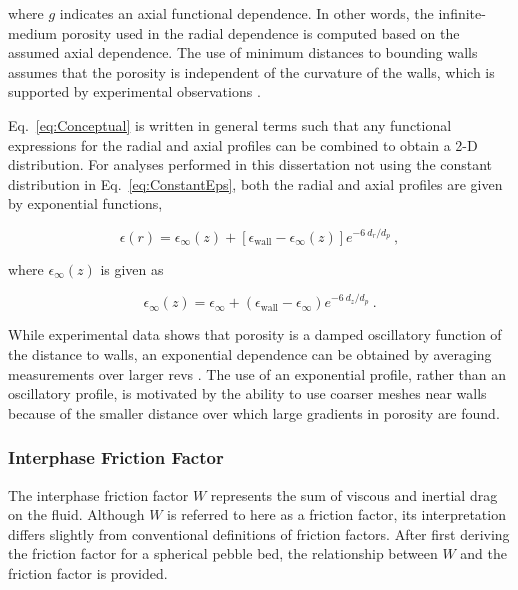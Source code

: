 \noindent where \(g\) indicates an axial functional dependence. In other words, the infinite-medium porosity used in the radial dependence is computed based on the assumed axial dependence. The use of minimum distances to bounding walls assumes that the porosity is independent of the curvature of the walls, which is supported by experimental observations \cite{duToit2008,benenati}. 

Eq.\ \eqref{eq:Conceptual} is written in general terms such that any functional expressions for the radial and axial profiles can be combined to obtain a 2-D distribution. For analyses performed in this dissertation not using the constant distribution in Eq.\ \eqref{eq:ConstantEps}, both the radial and axial profiles are given by exponential functions,

\begin{equation}
\label{eq:ExpPorosity2}
\epsilon(r)=\epsilon_\infty(z)+\left\lbrack\epsilon_\text{wall}-\epsilon_\infty(z)\right\rbrack e^{-6\ d_r/d_p}\ ,
\end{equation}

\noindent where \(\epsilon_\infty(z)\) is given as

\begin{equation}
\epsilon_\infty(z)=\epsilon_\infty+\left(\epsilon_\text{wall}-\epsilon_\infty\right)e^{-6\ d_z/d_p}\ .
\end{equation}

\noindent While experimental data shows that porosity is a damped oscillatory function of the distance to walls, an exponential dependence can be obtained by averaging measurements over larger \glspl{rev} \cite{duToit2008,keil,vortmeyer}. The use of an exponential profile, rather than an oscillatory profile, is motivated by the ability to use coarser meshes near walls because of the smaller distance over which large gradients in porosity are found.

\subsubsection{Interphase Friction Factor}
\label{sec:W}

The interphase friction factor \(W\) represents the sum of viscous and inertial drag on the fluid. Although \(W\) is referred to here as a friction factor, its interpretation differs slightly from conventional definitions of friction factors. After first deriving the friction factor for a spherical pebble bed, the relationship between \(W\) and the friction factor is provided.

